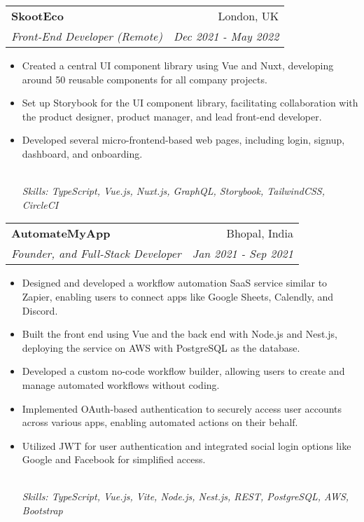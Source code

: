 \documentclass[letterpaper,12pt]{article}
\makeatletter
\newcommand{\resumeItem}[1]{
  \item\small{#1}\vspace{-2pt}
}
\newcommand{\resumeSubheading}[4]{
  \vspace{-2pt}\item
    \begin{tabular*}{0.97\textwidth}[t]{l@{\extracolsep{\fill}}r}
      \textbf{#1} & \small{#2} \\
      \textit{\small{#3}} & \textit{\small{#4}} \\
    \end{tabular*}\vspace{-5pt}
}
\newcommand{\resumeItemFooter}[1]{
    \\ \vspace{7pt}\hspace{-0.35in}\footnotesize\emph{#1}
}
\newcommand{\resumeItemListStart}{\begin{itemize}}
\newcommand{\resumeItemListEnd}{\end{itemize}\vspace{-5pt}}
\def\myHometown{Bhopal, India}
\makeatother
\begin{document}
\resumeSubheading
{SkootEco}{London, UK}
{Front-End Developer (Remote)}{Dec 2021 - May 2022}
\resumeItemListStart
\resumeItem{Created a central UI component library using Vue and Nuxt, developing around 50 reusable components for all company projects.}
\resumeItem{Set up Storybook for the UI component library, facilitating collaboration with the product designer, product manager, and lead front-end developer.}
\resumeItem{Developed several micro-frontend-based web pages, including login, signup, dashboard, and onboarding.}
\resumeItemFooter{Skills: TypeScript, Vue.js, Nuxt.js, GraphQL, Storybook, TailwindCSS, CircleCI}
\resumeItemListEnd

\resumeSubheading
{AutomateMyApp}{\myHometown}
{Founder, and Full-Stack Developer}{Jan 2021 - Sep 2021}
\resumeItemListStart
\resumeItem{Designed and developed a workflow automation SaaS service similar to Zapier, enabling users to connect apps like Google Sheets, Calendly, and Discord.}
\resumeItem{Built the front end using Vue and the back end with Node.js and Nest.js, deploying the service on AWS with PostgreSQL as the database.}
\resumeItem{Developed a custom no-code workflow builder, allowing users to create and manage automated workflows without coding.}
\resumeItem{Implemented OAuth-based authentication to securely access user accounts across various apps, enabling automated actions on their behalf.}
\resumeItem{Utilized JWT for user authentication and integrated social login options like Google and Facebook for simplified access.}
\resumeItemFooter{Skills: TypeScript, Vue.js, Vite, Node.js, Nest.js, REST, PostgreSQL, AWS, Bootstrap}
\resumeItemListEnd
\end{document}
